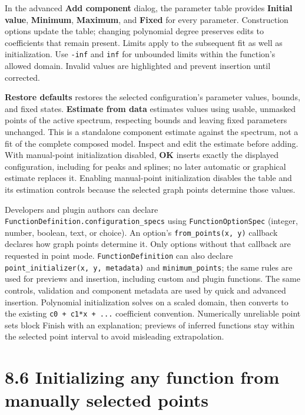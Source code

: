 \documentclass[
  10pt,
  a4paper,
  oneside]{scrreprt}
\begin{document}
In the advanced \textbf{Add component} dialog, the parameter table
provides \textbf{Initial value}, \textbf{Minimum}, \textbf{Maximum}, and
\textbf{Fixed} for every parameter. Construction options update the
table; changing polynomial degree preserves edits to coefficients that
remain present. Limits apply to the subsequent fit as well as
initialization. Use \texttt{-inf} and \texttt{inf} for unbounded limits
within the function's allowed domain. Invalid values are highlighted and
prevent insertion until corrected.

\textbf{Restore defaults} restores the selected configuration's
parameter values, bounds, and fixed states. \textbf{Estimate from data}
estimates values using usable, unmasked points of the active spectrum,
respecting bounds and leaving fixed parameters unchanged. This is a
standalone component estimate against the spectrum, not a fit of the
complete composed model. Inspect and edit the estimate before adding.
With manual-point initialization disabled, \textbf{OK} inserts exactly
the displayed configuration, including for peaks and splines; no later
automatic or graphical estimate replaces it. Enabling manual-point
initialization disables the table and its estimation controls because
the selected graph points determine those values.

Developers and plugin authors can declare
\texttt{FunctionDefinition.configuration\_specs} using
\texttt{FunctionOptionSpec} (integer, number, boolean, text, or choice).
An option's \texttt{from\_points(x,\ y)} callback declares how graph
points determine it. Only options without that callback are requested in
point mode. \texttt{FunctionDefinition} can also declare
\texttt{point\_initializer(x,\ y,\ metadata)} and
\texttt{minimum\_points}; the same rules are used for previews and
insertion, including custom and plugin functions. The same controls,
validation and component metadata are used by quick and advanced
insertion. Polynomial initialization solves on a scaled domain, then
converts to the existing \texttt{c0\ +\ c1*x\ +\ ...} coefficient
convention. Numerically unreliable point sets block Finish with an
explanation; previews of inferred functions stay within the selected
point interval to avoid misleading extrapolation.

\hypertarget{initializing-any-function-from-manually-selected-points}{%
\section{8.6 Initializing any function from manually selected
points}\label{initializing-any-function-from-manually-selected-points}}
\end{document}
